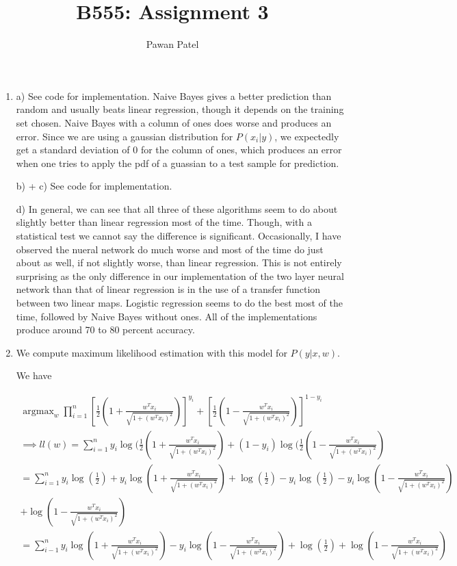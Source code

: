 \documentclass[12pt]{article}
\theoremstyle{plain}
\theoremstyle{definition}
\DeclareMathOperator{\argmax}{argmax}
\begin{document}
 

\title{B555: Assignment 3}
\author{Pawan Patel}
\maketitle

\begin{enumerate}

\item

a) See code for implementation. Naive Bayes gives a better prediction than random and usually beats linear regression, though it depends on the training set chosen. Naive Bayes with a column of ones does worse and produces an error. Since we are using a gaussian distribution for $P(x_i|y)$, we expectedly get a standard deviation of 0 for the column of ones, which produces an error when one tries to apply the pdf of a guassian to a test sample for prediction. 

b) + c) See code for implementation. 

d) In general, we can see that all three of these algorithms seem to do about slightly better than linear regression most of the time. Though, with a statistical test we cannot say the difference is significant. Occasionally, I have observed the nueral network do much worse and most of the time do just about as well, if not slightly worse, than linear regression. This is not entirely surprising as the only difference in our implementation of the two layer neural network than that of linear regression is in the use of a transfer function between two linear maps. Logistic regression seems to do the best most of the time, followed by Naive Bayes without ones. All of the implementations produce around 70 to 80 percent accuracy.

\vspace{20pc}
\item

We compute maximum likelihood estimation with this model for $P(y|x, w)$.

We have

\begin{align*}
\argmax_w \prod_{i=1}^n [\frac{1}{2} (1 + \frac{w^Tx_i}{\sqrt{1+(w^Tx_i)^2}})]^{y_i} + [\frac{1}{2} (1 - \frac{w^Tx_i}{\sqrt{1+(w^Tx_i)^2}})]^{1 - y_i} \\
\implies ll(w) = \sum_{i=1}^n y_i \log(\frac{1}{2} (1 + \frac{w^Tx_i}{\sqrt{1+(w^Tx_i)^2}}) + (1-y_i) \log(\frac{1}{2} (1 - \frac{w^Tx_i}{\sqrt{1+(w^Tx_i)^2}}) \\
= \sum_{i=1}^n y_i \log(\frac{1}{2}) + y_i \log(1 + \frac{w^Tx_i}{\sqrt{1+(w^Tx_i)^2}}) +  \log(\frac{1}{2}) - y_i \log(\frac{1}{2}) - y_i \log(1 - \frac{w^Tx_i}{\sqrt{1+(w^Tx_i)^2}}) \\
+ \log(1 - \frac{w^Tx_i}{\sqrt{1+(w^Tx_i)^2}})    \\
= \sum_{i-1}^n y_i \log(1 + \frac{w^Tx_i}{\sqrt{1+(w^Tx_i)^2}}) - y_i \log(1 - \frac{w^Tx_i}{\sqrt{1+(w^Tx_i)^2}}) + \log(\frac{1}{2}) + \log(1 - \frac{w^Tx_i}{\sqrt{1+(w^Tx_i)^2}})
\end{align*}


\end{enumerate}
\end{document}
